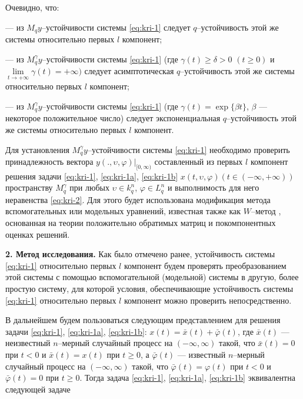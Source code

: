 Очевидно, что:

--- из  $M_qy$--устойчивости системы \eqref{eq:kri-1}
следует $q$--устойчивость этой же системы относительно  первых $l$
компонент;

--- из $M_q^\gamma y$--устойчивости системы \eqref{eq:kri-1}
(где $\gamma (t) \ge \delta > 0$ $(t \ge 0)$ и $\lim \limits _{t
\rightarrow +\infty } \gamma (t) = +\infty )$ следует
асимптотическая $q$--устойчивость этой же системы относительно
первых $l$ компонент;

--- из $M_q^\gamma y$--устойчивости системы \eqref{eq:kri-1}
(где $\gamma (t) = \exp \{\beta t\}$, $\beta$ --- некоторое
положительное число) следует экспоненциальная $q$--устойчивость этой
же системы относительно первых $l$ компонент.


Для установления $M_q^\gamma y$--устойчивости системы \eqref{eq:kri-1} необходимо
проверить принадлежность вектора $y(., \upsilon,\varphi
)|_{[0,\infty)}$ составленный из первых $l$ компонент решения задачи
\eqref{eq:kri-1}, \eqref{eq:kri-1a}, \eqref{eq:kri-1b} $x(t,\upsilon, \varphi)(t \in (-\infty, +\infty))$
пространству $M_q^\gamma$ при любых $\upsilon \in k^n_q$, $\varphi
\in L^n_q$ и выполнимость для него неравенства \eqref{eq:kri-2}. Для этого будет
использована модификация метода вспомогательных  или модельных
уравнений, известная также как $W$--метод \cite{bib:kad-5}, основанная на теории
положительно обратимых матриц и покомпонентных оценках решений.
\smallskip

\textbf {2. Метод исследования.} Как было отмечено ранее,
устойчивость системы \eqref{eq:kri-1} относительно первых $l$ компонент будем
проверять преобразованием этой системы с помощью вспомогательной
(модельной) системы в другую, более простую систему, для которой
условия, обеспечивающие устойчивость системы \eqref{eq:kri-1} относительно первых
$l$ компонент можно проверить непосредственно.

В дальнейшем будем пользоваться следующим представлением для решения
задачи \eqref{eq:kri-1}, \eqref{eq:kri-1a}, \eqref{eq:kri-1b}: $x(t) = \bar x(t) + \bar \varphi (t)$, где
$\bar x(t)$ --- неизвестный $n$--мерный случайный процесс на
$(-\infty, \infty)$ такой, что $\bar x(t) = 0$ при $t < 0$ и $\bar
x(t) = x(t)$ при $t \geq 0$,  а $\bar  \varphi (t)$ --- известный
$n$--мерный случайный процесс на $(-\infty, \infty)$ такой, что
$\bar \varphi(t) = \varphi (t)$ при $t < 0$ и $\bar \varphi(t) = 0$
при $t \geq 0$.  Тогда  задача \eqref{eq:kri-1}, \eqref{eq:kri-1a}, \eqref{eq:kri-1b} эквивалентна
следующей задаче

